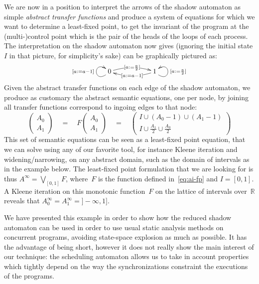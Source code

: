 \documentclass[orivec]{llncs} \usepackage[T1]{fontenc}
\newcommand{\R}{\mathbb{R}}
\newcommand{\qeq}{\quad=\quad}
\newcommand{\vxym}[1]{\vcenter{\xymatrix{#1}}}
\begin{document}
We are now in a position to interpret the arrows of the shadow automaton as
simple \emph{abstract transfer functions} and produce a system of equations for
which we want to determine a least-fixed point, to get the invariant of the
program at the (multi-)control point which is the pair of the heads of the loops
of each process.
The interpretation on the shadow automaton now gives (ignoring the initial state $I$ in that picture, for
simplicity's sake) can be graphically pictured as:
\[
\vxym{
  0 \ar@(dl,ul)^{[a := a-1]}\ar@/^/[rr]|{[a := \frac a2]}&&\ar@/^/[ll]|{[a := a-1]}1\ar@(dr,ur)_{[a := \frac a2]}
}
\]
Given the abstract transfer functions on each edge of the shadow automaton,
we produce as customary the abstract semantic equations, one per node, by
joining all transfer functions correspond to ingoing edges to that node:
\begin{equation}
  \label{eq:ai-fp}
\left(
    \begin{matrix}
      A_0\\A_1
    \end{matrix}
  \right)
  \qeq
  F
  \left(
    \begin{matrix}
      A_0\\A_1
    \end{matrix}
  \right)
  \qeq
  \left(
    \begin{matrix}
      I \cup (A_0-1)\cup (A_1-1)\\
      I \cup \frac{A_1}{2}\cup \frac{A_0}{2}
    \end{matrix}
  \right)
\end{equation}
This set of semantic equations can be seen as a least-fixed point equation, that
we can solve using any of our favorite tool, for instance Kleene iteration and
widening/narrowing, on any abstract domain, such as the domain of intervals as
in the example below.
The least-fixed point formulation that we are looking for is thus $A^{\infty}=
\bigvee_{[0,1]} F$, where~$F$ is the function defined in~\eqref{eq:ai-fp} and
$I=[0,1]$.
A Kleene iteration on this monotonic function~$F$ on the lattice of intervals
over~$\R$ reveals that $A_0^{\infty}=A_1^{\infty}=]-\infty,1]$.

We have presented this example in order to show how the reduced shadow automaton
can be used in order to use usual static analysis methods on concurrent
programs, avoiding state-space explosion as much as possible. It has the
advantage of being short, however it does not really show the main interest of
our technique: the scheduling automaton allows us to take in account properties
which tightly depend on the way the synchronizations constraint the executions
of the programs.
\end{document}
